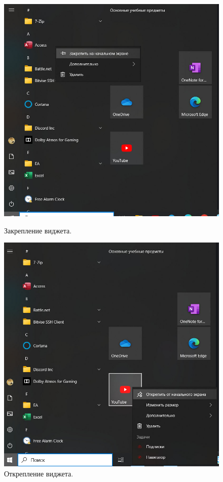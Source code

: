 \begin{figure}[h!]
    \centering
    \begin{minipage}[p]{0.45\linewidth}
            \centering
            \includegraphics[width=1\linewidth]{Pic/lab1/photo_2025-05-21_08-15-05.jpg}
            \caption{Закрепление виджета.}
            \label{fig:addvid}
    \end{minipage}
    \hfill
    \begin{minipage}[p]{0.45\linewidth}
            \centering
            \includegraphics[width=0.95\linewidth]{Pic/lab1/photo_2025-05-21_08-15-07.jpg}
            \caption{Открепление виджета.}
            \label{fig:remvid}
    \end{minipage}
\end{figure}
